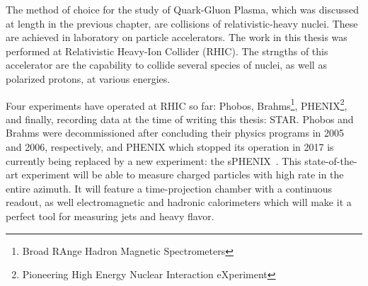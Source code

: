 The method of choice for the study of Quark-Gluon Plasma, which was discussed at length in the previous chapter, are collisions of relativistic-heavy nuclei. These are achieved in laboratory on particle accelerators. The work in this thesis was performed at Relativistic Heavy-Ion Collider (RHIC)\@. The strngths of this accelerator are the capability to collide several species of nuclei, as well as polarized protons, at various energies. 


Four experiments have operated at RHIC so far: Phobos, Brahms\footnote{Broad RAnge Hadron Magnetic Spectrometers}, PHENIX\footnote{Pioneering High Energy Nuclear Interaction eXperiment}, and finally, recording data at the time of writing this thesis: STAR. Phobos and Brahms were decommissioned after concluding their physics programs in 2005 and 2006, respectively, and PHENIX which stopped its operation in 2017 is currently being replaced by a new experiment: the sPHENIX~\cite{sphenix}. This state-of-the-art experiment will be able to measure charged particles with high rate in the entire azimuth. It will feature a time-projection chamber with a continuous readout, as well electromagnetic and hadronic calorimeters which will make it a perfect tool for measuring jets and heavy flavor.


